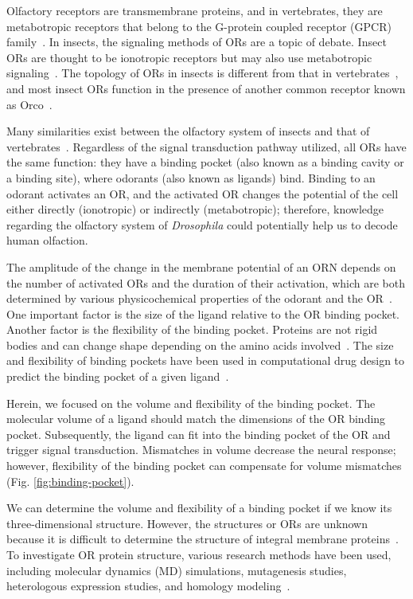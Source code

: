 \documentclass[fleqn,11pt]{wlscirep}
\begin{document}
Olfactory receptors are transmembrane proteins, and 
in vertebrates, they are metabotropic receptors 
that belong to the G-protein coupled receptor (GPCR) family~\cite{Buck1991,niimura2009evolutionary}. 
In insects, the signaling methods of ORs are a topic of debate. 
Insect ORs are thought to be ionotropic receptors but may also use metabotropic signaling~\cite{Sato2008,Wicher2008,Nagel2011,Rong2011,yao2010}.
The topology of ORs in insects is different from that in vertebrates~\cite{Benton2006,Smart2008},
and most insect ORs function in the presence of another common receptor known as Orco~\cite{Larsson2004}.

Many similarities exist between the olfactory system of insects and that of vertebrates~\cite{Wilson2014,Kaupp2010}.
Regardless of the signal transduction pathway utilized, 
all ORs have the same function: they have a binding pocket (also known as a binding cavity or a binding site), 
where odorants (also known as ligands) bind. 
Binding to an odorant activates an OR, and 
the activated OR changes the potential of the cell either 
directly (ionotropic) or indirectly (metabotropic);
therefore, knowledge regarding the olfactory system of \textit{Drosophila} could potentially help us to decode human olfaction. 

The amplitude of the change in the membrane potential of an ORN depends on the number of activated ORs and the duration of their activation,
which are both determined by various physicochemical properties of the odorant and the OR~\cite{Turin,Araneda2000,Gabler2013,guerrieri2005,uchida2000}.
One important factor is the size of the ligand relative to the OR binding pocket. 
Another factor is the flexibility of the binding pocket. 
Proteins are not rigid bodies and can change shape 
depending on the amino acids involved~\cite{Ramachandran,apostolakis1998docking,gunasekaran2007different}.
The size and flexibility of binding pockets have been used in computational drug design to predict the binding pocket of a given ligand~\cite{liang1998anatomy}. 

Herein, we focused on the volume and flexibility of the binding pocket.
The molecular volume of a ligand should match the dimensions of the OR binding pocket. Subsequently, 
the ligand can fit into the binding pocket of the OR and trigger signal transduction. 
Mismatches in volume decrease the neural response; however, 
flexibility of the binding pocket can compensate for volume mismatches (Fig. \ref{fig:binding-pocket}).

We can determine the volume and flexibility of a binding pocket 
if we know its three-dimensional structure. 
However, the structures or ORs are unknown 
because it is difficult to determine the structure of integral membrane proteins~\cite{Zhang2008,Lupieri2009}.
To investigate OR protein structure, various research methods have been used, including molecular dynamics (MD) simulations, 
mutagenesis studies, heterologous expression studies, and homology modeling~\cite{Khafizov2007,Man2004,Lai2005,Vaidehi2002,Floriano2004,Schmiedeberg2007,Katada2005,Kato2008,Rospars2013}.
\end{document}

